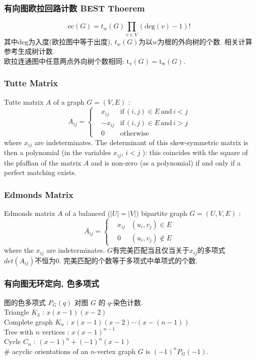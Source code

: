 \subsubsection{有向图欧拉回路计数 BEST Thoerem}
        \[ \mathrm{ec}(G) = t_w(G)\prod_{v \in{V}}(\mathrm{deg}(v) - 1)! \]
        其中$\mathrm{deg}$为入度(欧拉图中等于出度), $t_w(G)$为以$w$为根的外向树的个数. 相关计算参考生成树计数.\\
        欧拉连通图中任意两点外向树个数相同: $\mathrm{t_v}(G) = \mathrm{t_w}(G)$.
\subsubsection{Tutte Matrix}
    Tutte matrix $A$ of a graph $G=(V,E)$ : 
    \[A_{ij}=\left\{
        \begin{aligned}
            & x_{ij} & \text{if} \, (i,j)\in E \, \text{and}\, i<j \\
            & -x_{ij} & \text{if}\, (i,j)\in E \, \text{and}\, i>j \\
            & 0 & \text{otherwise}
        \end{aligned}
        \right.\]
    where $x_{ij}$ are indeterminates. The determinant of this skew-symmetric matrix is then a polynomial (in the variables $x_{ij}$, $i<j$ ): this coincides with the square of the pfaffian of the matrix $A$ and is non-zero (as a polynomial) if and only if a perfect matching exists.

    \subsubsection{Edmonds Matrix}
        Edmonds matrix $A$ of a balanced ($|U|=|V|$) bipartite graph $G=(U,V,E)$ : 
        \[A_{ij}=\left\{
            \begin{aligned}
                & x_{ij} & (u_i,v_j)\in E\\
                & 0 & (u_i,v_j)\notin E
            \end{aligned}
            \right.\]
        where the $x_{ij}$ are indeterminates. $G$有完美匹配当且仅当关于$x_{ij}$的多项式$det(A_{ij})$不恒为$0$.
        完美匹配的个数等于多项式中单项式的个数.
\subsubsection{有向图无环定向, 色多项式}
    \noindent
    图的色多项式 $P_G(q)$ 对图 $G$ 的 $q$-染色计数.\\
    Triangle $K_3$ : $x(x-1)(x-2)$\\
    Complete graph $K_n$ : $x(x-1)(x-2)\cdots (x-(n-1))$\\
    Tree with $n$ vertices : $x(x-1)^{n-1}$\\
    Cycle $C_n$ : $(x-1)^{n}+(-1)^{n}(x-1)$\\
    \# acyclic orientations of an $n$-vertex graph $G$ is $(-1)^nP_G(-1)$.
